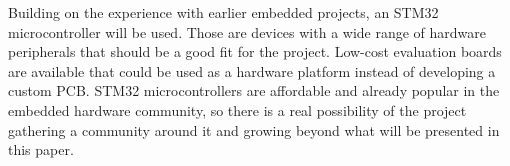Building on the experience with earlier embedded projects, an STM32 microcontroller will be used. Those are \armcm devices with a wide range of hardware peripherals that should be a good fit for the project. Low-cost evaluation boards are available that could be used as a hardware platform instead of developing a custom \gls{PCB}. STM32 microcontrollers are affordable and already popular in the embedded hardware community, so there is a real possibility of the project gathering a community around it and growing beyond what will be presented in this paper.

